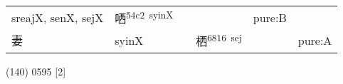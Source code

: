 \documentclass[14pt,a4paper]{scrartcl}
\begin{document}
\begin{longtable}[c]{@{}llllll@{}}
\begin{minipage}[t]{0.14\columnwidth}
sreajX, senX, sejX
\strut\end{minipage} &
\begin{minipage}[t]{0.14\columnwidth}\raggedright\strut
哂\textsuperscript{54c2~syinX}
\strut\end{minipage} &
\begin{minipage}[t]{0.14\columnwidth}\raggedright\strut
\strut\end{minipage} &
\begin{minipage}[t]{0.14\columnwidth}\raggedright\strut
\strut\end{minipage} &
\begin{minipage}[t]{0.14\columnwidth}\raggedright\strut
pure:B
\strut\end{minipage}\tabularnewline
\begin{minipage}[t]{0.14\columnwidth}\raggedright\strut
妻
\strut\end{minipage} &
\begin{minipage}[t]{0.14\columnwidth}\raggedright\strut
syinX
\strut\end{minipage} &
\begin{minipage}[t]{0.14\columnwidth}\raggedright\strut
\strut\end{minipage} &
\begin{minipage}[t]{0.14\columnwidth}\raggedright\strut
栖\textsuperscript{6816~sej}
\strut\end{minipage} &
\begin{minipage}[t]{0.14\columnwidth}\raggedright\strut
\strut\end{minipage} &
\begin{minipage}[t]{0.14\columnwidth}\raggedright\strut
pure:A
\strut\end{minipage}\tabularnewline
\bottomrule
\end{longtable}

(140) 0595 {[}2{]}
\end{document}
